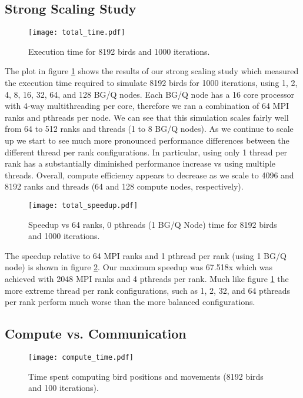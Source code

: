 \subsection*{Strong Scaling Study}

\begin{figure}[h!]
  \centering
  \texttt{[image: total\_time.pdf]}
  \caption{Execution time for 8192 birds and 1000 iterations.\label{fig:total}}
\end{figure}

The plot in figure \ref{fig:total} shows the results of our strong scaling study which
measured the execution time required to simulate 8192 birds for 1000 iterations,
using 1, 2, 4, 8, 16, 32, 64, and 128 BG/Q nodes. Each BG/Q node has a 16
core processor with 4-way multithreading per core, therefore we ran a combination
of 64 MPI ranks and pthreads per node. We can see that this simulation scales
fairly well from 64 to 512 ranks and threads (1 to 8 BG/Q nodes). As we continue to
scale up we start to see much more pronounced performance differences between
the different thread per rank configurations. In particular, using only 1 thread
per rank has a substantially diminished performance increase vs using multiple
threads. Overall, compute efficiency appears to decrease as we scale to 4096 and
8192 ranks and threads (64 and 128 compute nodes, respectively).

\begin{figure}[h!]
  \centering
  \texttt{[image: total\_speedup.pdf]}
  \caption{Speedup vs 64 ranks, 0 pthreads (1 BG/Q Node) time for 8192 birds and 1000 iterations.\label{fig:totalspeedup}}
\end{figure}

The speedup relative to 64 MPI ranks and 1 pthread per rank (using 1 BG/Q node)
is shown in figure \ref{fig:totalspeedup}. Our maximum speedup was 67.518x which was
achieved with 2048 MPI ranks and 4 pthreads per rank. Much like figure \ref{fig:total}
the more extreme thread per rank configurations, such as 1, 2, 32, and 64 pthreads
per rank perform much worse than the more balanced configurations.

\subsection*{Compute vs. Communication}

\begin{figure}[h!]
  \centering
  \texttt{[image: compute\_time.pdf]}
  \caption{Time spent computing bird positions and movements (8192 birds and 100 iterations).\label{fig:compute}}
\end{figure}

